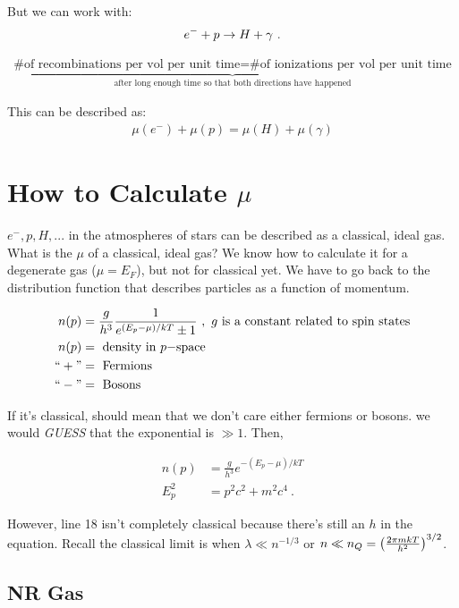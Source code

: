 But we can work with:
\begin{align}
e^- + p \rightarrow H + \gamma~.
\end{align}

\begin{align}
\underbrace{\text{\# of recombinations per vol per unit time} = \text{\# of ionizations per vol per unit time}}_{\text{after long enough time so that both directions have happened}}
\end{align}

This can be described as:
\begin{align}
\mu(e^-) + \mu(p) = \mu(H) + \mu(\gamma)
\end{align}

\section{How to Calculate $\mu$}

$e^-,p,H,...$ in the atmospheres of stars can be described as a classical, ideal gas. What is the $\mu$ of a classical, ideal gas? We know how to calculate it for a degenerate gas ($\mu = E_F$), but not for classical yet. We have to go back to the distribution function that describes particles as a function of momentum. 

\begin{align}
n(p) &= \frac{g}{h^3} \frac{1}{e^{(E_p - \mu)/kT} \pm 1}~,\text{ $g$ is a constant related to spin states}\\
n(p) &= \text{ density in $p-$space}\\
``+" &= \text{ Fermions}\\
``-" &= \text{ Bosons}
\end{align}

If it's classical, should mean that we don't care either fermions or bosons. we would \textit{GUESS} that the exponential is $\gg 1$. Then,

\begin{align}
n(p) &= \frac{g}{h^3}e ^{-(E_p - \mu)/kT}\\
E_p^2 &= p^2c^2 +  m^2c^4~.
\end{align}

However, line 18 isn't completely classical because there's still an $h$ in the equation. Recall the classical limit is when $\lambda \ll n^{-1/3}$ or $n \ll n_Q = \left( \frac{2 \pi m kT}{h^2} \right)^{3/2}$.

\subsection{NR Gas}

